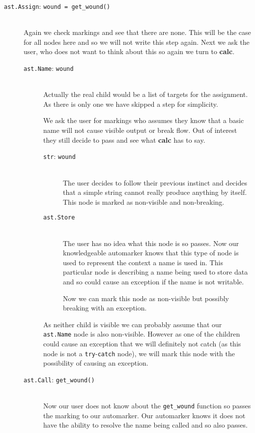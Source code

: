\documentclass{report}
\begin{document}
\begin{description}
  \item[\texttt{ast.Assign}: \texttt{wound = get\_wound()}] \hfill \\
  Again we check markings and see that there are none. This will be the case for all nodes here and so we will not write this step again.
  Next we ask the user, who does not want to think about this so again we turn to \textbf{calc}.
  \begin{description}
    \item[\texttt{ast.Name}: \texttt{wound}] \hfill \\
    Actually the real child would be a list of targets for the assignment. As there is only one we have skipped a step for simplicity.
    
    We ask the user for markings who assumes they know that a basic name will not cause visible output or break flow. Out of interest they still
    decide to pass and see what \textbf{calc} has to say.
    \begin{description}
      \item[\texttt{str}: \texttt{wound}] \hfill \\
      The user decides to follow their previous instinct and decides that a simple string cannot really produce anything by itself. This node is
      marked as non-visible and non-breaking.

      \item[\texttt{ast.Store}] \hfill \\
      The user has no idea what this node is so passes. Now our knowledgeable automarker knows that this type of node is used to represent the context
      a name is used in. This particular node is describing a name being used to store data and so could cause an exception if the name is not writable.
      
      Now we can mark this node as non-visible but possibly breaking with an exception.
    \end{description}

    As neither child is visible we can probably assume that our \texttt{ast.Name} node is also non-visible. However as one of the children could cause an
    exception that we will definitely not catch (as this node is not a \texttt{try}-\texttt{catch} node), we will mark this node with the possibility
    of causing an exception.

    \item[\texttt{ast.Call}: \texttt{get\_wound()}] \hfill \\
    Now our user does not know about the \texttt{get\_wound} function so passes the marking to our automarker. Our automarker knows it does not have
    the ability to resolve the name being called and so also passes.


\end{description}
\end{description}
\end{document}
